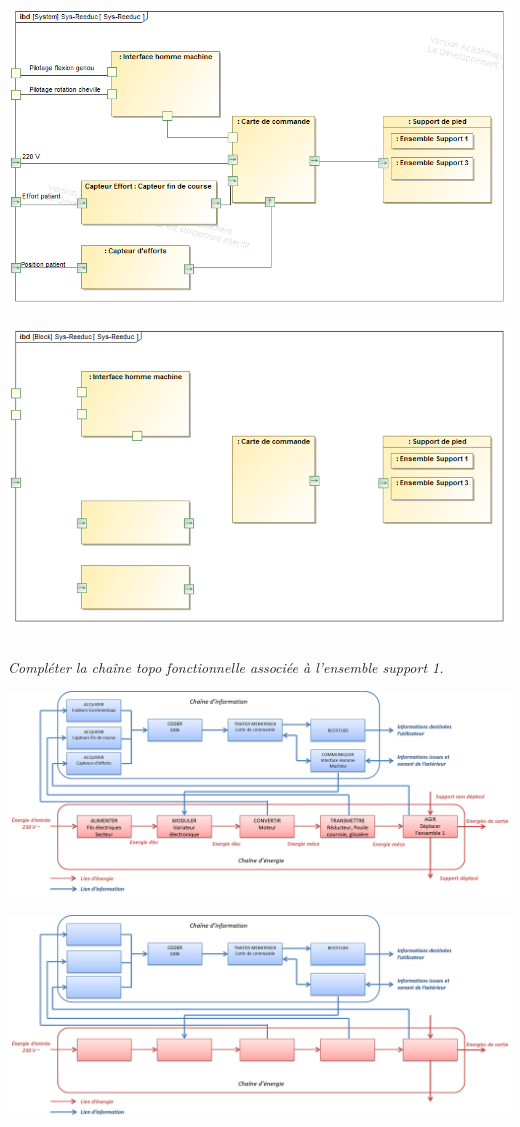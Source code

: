 \documentclass[10pt]{article}
\begin{document}
\ifprof
\begin{corrige}
\begin{center}
\includegraphics[width=.9\textwidth]{images/ibd_corr.png}
\end{center}
\end{corrige}
\else
\begin{center}
\includegraphics[width=\textwidth]{images/ibd}
\end{center}
\fi



\subparagraph{}
\textit{Compléter la chaîne topo fonctionnelle associée à l’ensemble support 1.}

\ifprof
\begin{corrige}
\begin{center}
\includegraphics[width=.9\textwidth]{images/cice_corr}
\end{center}
\end{corrige}
\else
\begin{center}
\includegraphics[width=\textwidth]{images/cice}
\end{center}
\fi
\end{document}
